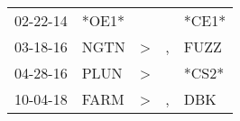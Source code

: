 \begin{supertabular}{p{0.07\textwidth}p{0.06\textwidth}p{0.02\textwidth}p{0.02\textwidth}p{0.06\textwidth}}
 02-22-14\textsuperscript{} &                            *OE1* &               &               &                           *CE1* \\
 03-18-16\textsuperscript{} &           NGTN\textsuperscript{} &  \textgreater &             , &          FUZZ\textsuperscript{} \\
 04-28-16\textsuperscript{} &           PLUN\textsuperscript{} &  \textgreater &               &                           *CS2* \\
 10-04-18\textsuperscript{} &           FARM\textsuperscript{} &  \textgreater &             , &           DBK\textsuperscript{} \\
\end{supertabular}
